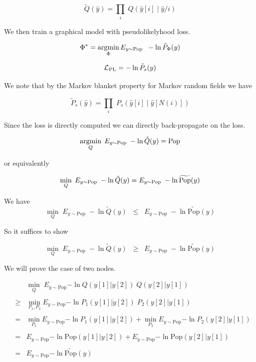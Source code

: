 {{\color{red} $$\tilde{Q}(\hat{y}) = \prod_i\;Q(\hat{y}[i]\;|\; \hat{y}/i)$$}

We then train a graphical model with pseudolikelyhood loss.

{\color{red} $$\Phi^* = \operatorname*{argmin}_\Phi E_{y \sim \mathrm{Pop}}\;\;-\ln \tilde{P}_\Phi(y)$$}



{\color{red} $${\cal L}_{\mathrm{PL}} = - \ln \tilde{P}_s(y)$$}

\vfill
We note that by the Markov blanket property for Markov random fields we have

{\color{red} $$\tilde{P}_s(\hat{y}) = \prod_i\;P_s(\hat{y}[i]\;|\; \hat{y}[N(i)])$$}

\vfill
Since the loss is directly computed we can directly back-propagate on the loss.






{\color{red} $$\operatorname*{argmin}_Q \; E_{y \sim \mathrm{Pop}} \;-\ln \tilde{Q}(y) = \mathrm{Pop}$$}

\vfill
or equivalently


\vfill
{\color{red} $$\min_Q \; E_{y \sim \mathrm{Pop}} \;-\ln \tilde{Q}(y) = E_{y \sim \mathrm{Pop}}\;-\ln \widetilde{\mathrm{Pop}}(y)$$}
\vfill


We have
$$\min_{Q} \;E_{y \sim \mathrm{Pop}}\;-\ln \tilde{Q}(y) \;\;\leq \;\; E_{y \sim \mathrm{Pop}}\;-\ln \widetilde{\mathrm{Pop}}(y)$$

\vfill
So it suffices to show

$$\min_{Q} \;E_{y \sim \mathrm{Pop}}\;-\ln \tilde{Q}(y) \;\;\geq \;\; E_{y \sim \mathrm{Pop}}\;-\ln \widetilde{\mathrm{Pop}}(y)$$


We will prove the case of two nodes.

\vfill
\begin{eqnarray*}
  & & \min_Q \;E_{y\sim \mathrm{Pop}}{-\ln Q(y[1]|y[2])\;Q(y[2]|y[1])} \\
  \\
  & \geq & \min_{P_1,P_2} E_{y \sim \mathrm{Pop}}{-\ln P_1(y[1]|y[2])\;P_2(y[2]|y[1])} \\
  \\
  & = & \min_{P_1} E_{y \sim \mathrm{Pop}}{-\ln P_1(y[1]|y[2])} + \min_{P_2} E_{y \sim \mathrm{Pop}}{-\ln P_2(y[2]|y[1])} \\
  \\
  & = & E_{y \sim \mathrm{Pop}}{-\ln \mathrm{Pop}(y[1]|y[2])} + E_{y \sim \mathrm{Pop}}{-\ln \mathrm{Pop}(y[2]|y[1])} \\
  \\
  & = & E_{y \sim \mathrm{Pop}}{-\ln \widetilde{\mathrm{Pop}}(y)}
\end{eqnarray*}

}
